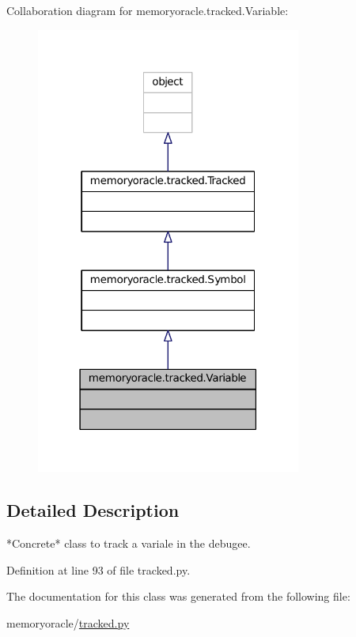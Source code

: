 Collaboration diagram for memoryoracle.\+tracked.\+Variable\+:
\nopagebreak
\begin{figure}[H]
\begin{center}
\leavevmode
\includegraphics[width=247pt]{classmemoryoracle_1_1tracked_1_1Variable__coll__graph}
\end{center}
\end{figure}


\subsection{Detailed Description}
\begin{DoxyVerb}*Concrete* class to track a variale in the debugee.
\end{DoxyVerb}
 

Definition at line 93 of file tracked.\+py.



The documentation for this class was generated from the following file\+:\begin{DoxyCompactItemize}
\item 
memoryoracle/\hyperlink{tracked_8py}{tracked.\+py}\end{DoxyCompactItemize}
